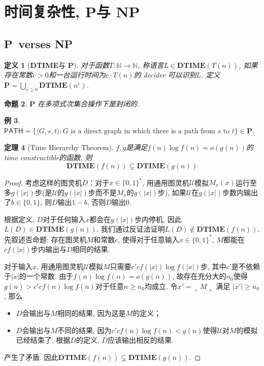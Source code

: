 \documentclass[8pt]{article}
\theoremstyle{compact}
\newtheorem{theorem}{定理}[section]
\newtheorem{definition}[theorem]{定义}
\newtheorem{proposition}[theorem]{命题}
\newtheorem{example}[theorem]{例}
\def\ge{\geqslant}
\def\rep#1{\llcorner{#1}\lrcorner}
\def\DTIME{\textbf{DTIME}}
\def\P{\textbf{P}}
\def\NP{\textbf{NP}}
\begin{document}
\newpage
\section{时间复杂性, \P 与 \NP}
\subsection{\P \ verses \NP}
\begin{definition}[\DTIME 与 \P]
	对于函数$T: \mathbb N \to \mathbb N$, 称语言$L \in \DTIME(T(n))$, 如果存在常数$c > 0$和一台运行时间为$c \cdot T(n)$的 decider 可以识别$L$. 定义 $\P = \bigcup_{c \ge 0}\DTIME(n^c)$. 
\end{definition}
\begin{proposition}
	$\P$ 在多项式次集合操作下是封闭的.
\end{proposition}
\begin{example}
	$\textsf{PATH} = \{ \langle G, s, t\rangle : G \textrm{ is a direct graph in which there is a path from }s \textrm{ to } t\} \in \P.$
\end{example}
\begin{theorem}[Time Hierarchy Theorem]
	$f, g$是满足$f(n) \log f(n) = o(g(n))$的time constructible的函数, 则
	$$\DTIME(f(n)) \subsetneq \DTIME(g(n))$$
	\label{time_hierarchy_thm}
\end{theorem}
\begin{proof}
	考虑这样的图灵机$D$：对于$x \in \{0, 1\}^*$, 用通用图灵机$\mathcal{U}$模拟$M_x(x)$运行至多$g(|x|)$步(是$\mathcal U$的$g(|x|)$步而不是$M_x$的$g(|x|)$步), 如果$\mathcal{U}$在$g(|x|)$步数内输出了$b \in \{0, 1\}$, 则$D$输出$1-b$, 否则$D$输出$0$. 

	根据定义, $D$对于任何输入$x$都会在$g(|x|)$步内停机, 因此$L(D) \in \DTIME(g(n))$. 我们通过反证法证明$L(D) \notin \DTIME(f(n))$. 先叙述否命题: 存在图灵机$M$和常数$c$, 使得对于任意输入$x \in \{0, 1\}^*$, $M$都能在$cf(|x|)$步内输出与$D$相同的结果. 

	对于输入$x$, 用通用图灵机$\mathcal{U}$模拟$M$只需要$c'cf(|x|)\log f(|x|)$步, 其中$c'$是不依赖于$|x|$的一个常数. 由于$f(n) \log f(n) = o(g(n))$, 故存在充分大的$n_0$使得$g(n) > c'cf(n) \log f(n)$对于任意$n \ge n_0$均成立. 令$x' = \rep{M}$ 满足 $|x'| \ge n_0$, 那么
	\begin{itemize}
		\item $D$会输出与$M$相同的结果, 因为这是$M$的定义；
		\item $D$会输出与$M$不同的结果, 因为$c'cf(n)\log f(n) < g(n)$使得$\mathcal U$对$M$的模拟已经结束了, 根据$D$的定义, $D$应该输出相反的结果. 
	\end{itemize}

	产生了矛盾. 因此$\DTIME(f(n)) \subsetneq \DTIME(g(n))$. 
\end{proof}
\end{document}
